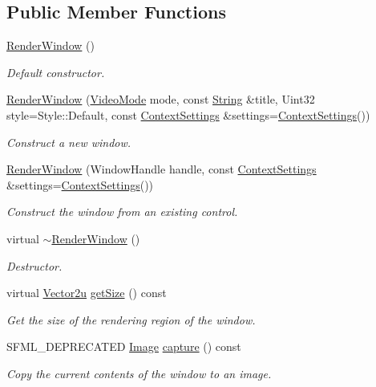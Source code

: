 \subsection*{Public Member Functions}
\begin{DoxyCompactItemize}
\item 
\hyperlink{classsf_1_1_render_window_a839bbf336bdcafb084dafc3076fc9021}{Render\+Window} ()
\begin{DoxyCompactList}\small\item\em Default constructor. \end{DoxyCompactList}\item 
\hyperlink{classsf_1_1_render_window_aebef983e01f677bf5a66cefc4d547647}{Render\+Window} (\hyperlink{classsf_1_1_video_mode}{Video\+Mode} mode, const \hyperlink{classsf_1_1_string}{String} \&title, Uint32 style=Style\+::\+Default, const \hyperlink{structsf_1_1_context_settings}{Context\+Settings} \&settings=\hyperlink{structsf_1_1_context_settings}{Context\+Settings}())
\begin{DoxyCompactList}\small\item\em Construct a new window. \end{DoxyCompactList}\item 
\hyperlink{classsf_1_1_render_window_a25c0af7d515e710b6eebc9c6be952aa5}{Render\+Window} (Window\+Handle handle, const \hyperlink{structsf_1_1_context_settings}{Context\+Settings} \&settings=\hyperlink{structsf_1_1_context_settings}{Context\+Settings}())
\begin{DoxyCompactList}\small\item\em Construct the window from an existing control. \end{DoxyCompactList}\item 
virtual \hyperlink{classsf_1_1_render_window_a3407e36bfc1752d723140438a825365c}{$\sim$\+Render\+Window} ()
\begin{DoxyCompactList}\small\item\em Destructor. \end{DoxyCompactList}\item 
virtual \hyperlink{classsf_1_1_vector2}{Vector2u} \hyperlink{classsf_1_1_render_window_ae3eacf93661c8068fca7a78d57dc7e14}{get\+Size} () const
\begin{DoxyCompactList}\small\item\em Get the size of the rendering region of the window. \end{DoxyCompactList}\item 
S\+F\+M\+L\+\_\+\+D\+E\+P\+R\+E\+C\+A\+T\+ED \hyperlink{classsf_1_1_image}{Image} \hyperlink{classsf_1_1_render_window_a370137abe81f6b7d62b600ceeccd54d3}{capture} () const
\begin{DoxyCompactList}\small\item\em Copy the current contents of the window to an image. \end{DoxyCompactList}\end{DoxyCompactItemize}
